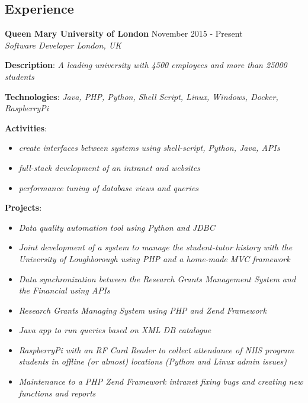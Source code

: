 \documentclass[margin]{res}
\begin{document}
\begin{resume}
\section{Experience}
  \textbf{Queen Mary University of London} \hfill {November 2015 - Present}\\
  \textit{Software Developer} \hfill \textit{London, UK}\\
  \begin{description}
    \item{\textbf{Description}: \textit{A leading university with 4500 employees and more than 25000 students}}
    \item{\textbf{Technologies}: \textit{Java, PHP, Python, Shell Script, Linux, Windows, Docker, RaspberryPi}}
    \item{
      \textbf{Activities}:
      \begin{itemize}
              \item{\textit{create interfaces between systems using shell-script, Python, Java, APIs}}
              \item{\textit{full-stack development of an intranet and websites}}
              \item{\textit{performance tuning of database views and queries}}
            \end{itemize}
    }
        \item{
      \textbf{Projects}:
      \begin{itemize}
              \item{\textit{Data quality automation tool using Python and JDBC}}
              \item{\textit{Joint development of a system to manage the student-tutor history with the University of Loughborough using PHP and a home-made MVC framework}}
              \item{\textit{Data synchronization between the Research Grants Management System and the Financial using APIs}}
              \item{\textit{Research Grants Managing System using PHP and Zend Framework}}
              \item{\textit{Java app to run queries based on XML DB catalogue}}
              \item{\textit{RaspberryPi with an RF Card Reader to collect attendance of NHS program students in offline (or almost) locations (Python and Linux       admin issues)}}
              \item{\textit{Maintenance to a PHP Zend Framework intranet fixing bugs and creating new functions and reports}}

\end{itemize}}
\end{description}
\end{resume}
\end{document}
